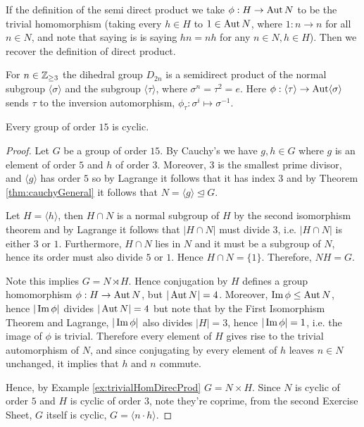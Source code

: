 \begin{example}
  If the definition of the semi direct product we take $\phi:H\to\operatorname{Aut} N$ to be the trivial
  homomorphism (taking every $h\in H$ to $1\in \operatorname{Aut} N$, where $1:n\to n$ for all $n\in
  N$, and note that saying is is saying $hn=nh$ for any $n\in N, h\in H$). Then we recover
  the definition of direct product.
  \label{ex:trivialHomDirecProd}
\end{example}

\begin{example}
  For $n\in\mathbb Z_{\geq 3}$ the dihedral group $D_{2n}$ is a semidirect product of the normal
  subgroup $\langle \sigma \rangle$ and the subgroup $\langle \tau \rangle$, where $\sigma
  ^n=\tau^2=e$. Here $\phi:\langle \tau \rangle\to \operatorname{Aut} \langle \sigma \rangle$ sends
  $\tau$ to the inversion automorphism, $\phi_{\tau}:\sigma^i\mapsto \sigma^{-1}$.
\end{example}

\begin{theorem}
  Every group of order $15$ is cyclic.
  \label{<+label+>}
\end{theorem}
\begin{proof}
  Let $G$ be a group of order $15$. By Cauchy's we have $g, h\in G$ where $g$ is an
  element of order $5$ and $h$ of order $3$. Moreover, $3$ is the smallest prime divisor,
  and $\langle g \rangle$ has order $5$ so by Lagrange it follows that it has index $3$
  and by Theorem \ref{thm:cauchyGeneral} it follows that $N=\langle g
  \rangle\trianglelefteq G$. 

  Let $H=\langle h \rangle$, then $H\cap N$ is a normal subgroup of
  $H$ by the second isomorphism theorem and by Lagrange it follows that $|H\cap N|$ must
  divide $3$, i.e. $|H\cap N|$ is either $3$ or $1$. Furthermore, $H\cap N$ lies in $N$
  and it must be a subgroup of $N$, hence its order must also divide $5$ or $1$. Hence
  $H\cap N=\{1\}$. Therefore, $NH=G$. 

  Note this implies $G= N\rtimes H$. Hence conjugation by $H$
  defines a group homomorphism $\phi:H\to\operatorname{Aut} N$, but $|\operatorname{Aut} N|=4$. Moreover, $\operatorname{Im}\phi
  \leq \operatorname{Aut} N$, hence $|\operatorname{Im}\phi|$ divides $|\operatorname{Aut} N|=4$ but note that by the First
  Isomorphism Theorem and Lagrange, $|\operatorname{Im} \phi|$ also divides $|H|=3$, hence
  $|\operatorname{Im}\phi|=1$, i.e. the image of $\phi$ is trivial. Therefore every element of $H$
  gives rise to the trivial automorphism of $N$, and since conjugating by every element of
  $h$ leaves $n\in N$ unchanged, it implies that $h$ and $n$ commute.

  Hence, by Example \ref{ex:trivialHomDirecProd} $G=N\times H$. Since $N$ is cyclic of
  order $5$ and $H$ is cyclic of order $3$, note they're coprime, from the second Exercise
  Sheet, $G$ itself is cyclic, $G=\langle n\cdot h \rangle$.
\end{proof}
